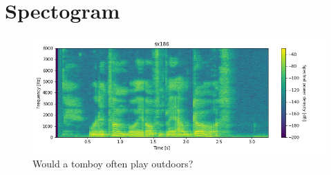 \documentclass[11pt]{article}
\begin{document}
\section{Spectogram}
\begin{figure}[h]
	\includegraphics[width=\linewidth]{./sx186_spectogram.png}
	\caption{Would a tomboy often play outdoors?}
\end{figure}
\end{document}
